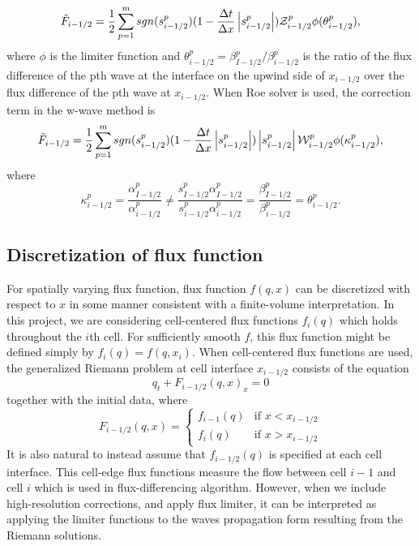\documentclass{article}
\providecommand{\abs}[1]{\left|#1\right|}
\begin{document}
\begin{align}
\tilde{F}_{i-1/2}=\frac{1}{2}\sum_{p=1}^{m} sgn(s_{i-1/2}^{p})(1-\frac{\Delta t}{\Delta x}\abs{s^p_{i-1/2}}){\cal Z}^p_{i-1/2} \phi(\theta^p_{i-1/2}),
\label{flimiter}
\end{align}
where $\phi$ is the limiter function and $\theta^p_{i-1/2}=\beta^p_{I-1/2}/\beta^p_{i-1/2}$ is the ratio of the flux difference of the pth wave at the interface on the upwind side of $x_{i-1/2}$ over the flux difference of the pth wave at $x_{i-1/2}$. When Roe solver is used, the correction term in the w-wave method is
\begin{align}
\tilde{F}_{i-1/2}=\frac{1}{2}\sum_{p=1}^{m} sgn(s_{i-1/2}^{p})(1-\frac{\Delta t}{\Delta x}\abs{s^p_{i-1/2}})\abs{s_{i-1/2}^p}{\cal W}^p_{i-1/2} \phi(\kappa^p_{i-1/2}),
\end{align}
where
\[
\kappa^p_{i-1/2}=\frac{\alpha^p_{I-1/2}}{\alpha^p_{i-1/2}}
\neq
\frac{s^p_{I-1/2}\alpha^p_{I-1/2}}{s^p_{i-1/2}\alpha^p_{i-1/2}}
=\frac{\beta^p_{I-1/2}}{\beta^p_{i-1/2}}=\theta^p_{i-1/2}.
\]

\subsection{Discretization of flux function}
	For spatially varying flux function, flux function $f(q,x)$ can be discretized with respect to $x$ in some manner consistent with a finite-volume interpretation. In this project, we are considering cell-centered flux functions $f_i(q)$ which holds throughout the $i$th cell. For sufficiently smooth $f$, this flux function might be defined simply by $f_i(q)=f(q,x_i)$. When cell-centered flux functions are used, the generalized Riemann problem at cell interface $x_{i-1/2}$ consists of the equation
	\[
	q_t + F_{i-1/2}(q,x)_x=0
	\]
	together with the initial data, where
	\[
	F_{i-1/2}(q,x)=\begin{cases}f_{i-1}(q) & \text{if } x<x_{i-1/2}\\
	f_i(q) & \text{if } x>x_{i-1/2}\end{cases}
	\]
	It is also natural to instead assume that $f_{i-1/2}(q)$ is specified at each cell interface. This cell-edge flux functions measure the flow between cell $i-1$ and cell $i$ which is used in flux-differencing algorithm. However, when we include high-resolution corrections, and apply flux limiter, it can be interpreted as applying the limiter functions to the waves propagation form resulting from the Riemann solutions.\\
	
\end{document}
